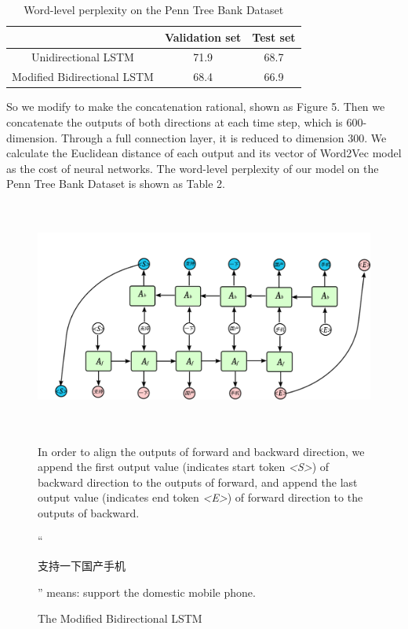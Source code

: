 \documentclass{sig-alternate}
\begin{document}
\begin{table}
\centering
\caption{Word-level perplexity on the Penn Tree Bank Dataset}
\label{tab:commands}
\begin{minipage}{\columnwidth}
\begin{center}
\begin{tabular}{c c c}
\hline
         &   Validation set &  Test set   \\ \hline
 Unidirectional LSTM & 71.9 & 68.7 \\ \hline
 Modified Bidirectional LSTM & 68.4 & 66.9 \\ \hline
\end{tabular}
\end{center}
\end{minipage}
\end{table}

So we modify to make the concatenation rational, shown as Figure 5. 
Then we concatenate the outputs of both directions at each time step, which 
is 600-dimension. Through a full connection layer, it is reduced to 
dimension 300. We calculate the Euclidean distance of each output and its 
vector of Word2Vec model as the cost of neural networks. The word-level perplexity of our model on the Penn Tree Bank Dataset is shown as Table 2.

\begin{figure}
  \centering
  \includegraphics[height=3in, width=6.21in]{bilstm2.png}
  \caption{The Modified Bidirectional LSTM}{In order to align the outputs of forward and backward direction, we append the first output value (indicates start token \emph{<S>}) of  
  backward direction to the outputs of forward, and append the last output value (indicates end token \emph{<E>}) of forward direction to the outputs of backward.}{“\begin{CJK}{UTF8}{gbsn}支持一下国产手机\end{CJK}” means: support the domestic mobile phone.}
\end{figure}
\end{document}
